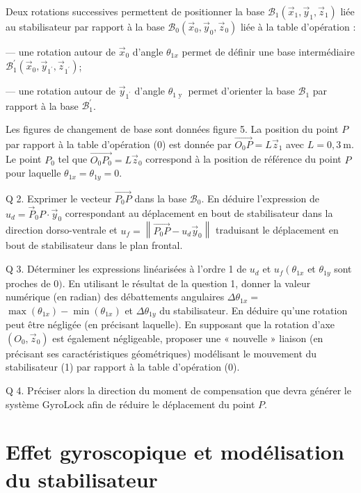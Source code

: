 \documentclass[10pt]{article}
\begin{document}
Deux rotations successives permettent de positionner la base $\mathcal{B}_{1}\left(\vec{x}_{1}, \vec{y}_{1}, \vec{z}_{1}\right)$ liée au stabilisateur par rapport à la base $\mathcal{B}_{0}\left(\vec{x}_{0}, \vec{y}_{0}, \vec{z}_{0}\right)$ liée à la table d'opération :

— une rotation autour de $\vec{x}_{0}$ d'angle $\theta_{1 x}$ permet de définir une base intermédiaire $\mathcal{B}_{1}^{\prime}\left(\vec{x}_{0}, \vec{y}_{1^{\prime}}, \vec{z}_{1^{\prime}}\right)$;

— une rotation autour de $\vec{y}_{1^{\prime}}$ d'angle $\theta_{1 \text { y }}$ permet d'orienter la base $\mathcal{B}_{1}$ par rapport à la base $\mathcal{B}_{1}^{\prime}$.

Les figures de changement de base sont données figure 5. La position du point $P$ par rapport à la table d'opération (0) est donnée par $\overrightarrow{O_{0} P}=L \vec{z}_{1}$ avec $L=0,3 \mathrm{~m}$. Le point $P_{0}$ tel que $\overrightarrow{O_{0} P_{0}}=L \vec{z}_{0}$ correspond à la position de référence du point $P$ pour laquelle $\theta_{1 x}=\theta_{1 y}=0$.

Q 2. Exprimer le vecteur $\overrightarrow{P_{0} P}$ dans la base $\mathcal{B}_{0}$. En déduire l'expression de $u_{d}=\vec{P}_{0} P \cdot \vec{y}_{0}$ correspondant au déplacement en bout de stabilisateur dans la direction dorso-ventrale et $u_{f}=\left\|\overrightarrow{P_{0} P}-u_{d} \vec{y}_{0}\right\|$ traduisant le déplacement en bout de stabilisateur dans le plan frontal.

Q 3. Déterminer les expressions linéarisées à l'ordre 1 de $u_{d}$ et $u_{f}\left(\theta_{1 x}\right.$ et $\theta_{1 y}$ sont proches de 0$)$. En utilisant le résultat de la question 1, donner la valeur numérique (en radian) des débattements angulaires $\Delta \theta_{1 x}=$ $\max \left(\theta_{1 x}\right)-\min \left(\theta_{1 x}\right)$ et $\Delta \theta_{1 y}$ du stabilisateur. En déduire qu'une rotation peut être négligée (en précisant laquelle). En supposant que la rotation d'axe $\left(O_{0}, \vec{z}_{0}\right)$ est également négligeable, proposer une « nouvelle » liaison (en précisant ses caractéristiques géométriques) modélisant le mouvement du stabilisateur (1) par rapport à la table d'opération (0).

Q 4. Préciser alors la direction du moment de compensation que devra générer le système GyroLock afin de réduire le déplacement du point $P$.

\section{Effet gyroscopique et modélisation du stabilisateur}
\end{document}
